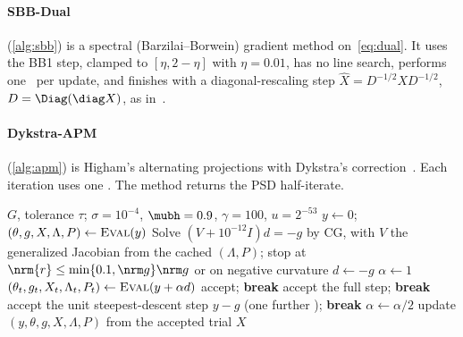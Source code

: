 \paragraph{SBB-Dual} (\cref{alg:sbb}) is a spectral (Barzilai--Borwein)
gradient method on~\eqref{eq:dual}. It uses the BB1 step, clamped to
$[\eta,2-\eta]$ with $\eta=0.01$, has no line search, performs one \EVD\ per
update, and finishes with a diagonal-rescaling step
$\hat X=D^{-1/2}XD^{-1/2}$, $D=\Diag(\diag X)$, as in~\cite{borsdorf2010preconditioned}.

\paragraph{Dykstra-APM} (\cref{alg:apm}) is Higham's alternating projections
with Dykstra's correction~\cite{higham2002nearest}. Each iteration uses one \EVD. The
method returns the PSD half-iterate.

\begin{algorithm}[p]
\caption{Newton-SIN-BH (semismooth Newton, cached factorization, BH line search)}\label{alg:newton}
\begin{algorithmic}[1]
\Require $G$, tolerance $\tau$; $\sigma=10^{-4}$, $\mubh=0.9$, $\gamma=100$, $u=2^{-53}$
\State $y\gets0$;\ $(\theta,g,X,\Lambda,P)\gets\textsc{Eval}(y)$ 
  \State Solve $(V+10^{-12}I)d=-g$ by CG, with $V$ the generalized Jacobian from the cached $(\Lambda,P)$;
  \Statex \hspace{\algorithmicindent} stop at $\nrm{r}\le\min\{0.1,\nrm g\}\nrm g$ or on negative curvature
   $d\gets-g$ \EndIf
  \State $\alpha\gets1$
  \Loop
    \State $(\theta_t,g_t,X_t,\Lambda_t,P_t)\gets\textsc{Eval}(y+\alpha d)$
     accept; \textbf{break} \EndIf
     
       accept the full step; \textbf{break} \EndIf
      \State accept the unit steepest-descent step $y-g$ (one further \EVD); \textbf{break}
    \EndIf
    \State $\alpha\gets\alpha/2$
  \EndLoop
  \State update $(y,\theta,g,X,\Lambda,P)$ from the accepted trial 
\EndWhile
\State \Return $X$
\end{algorithmic}
\end{algorithm}

